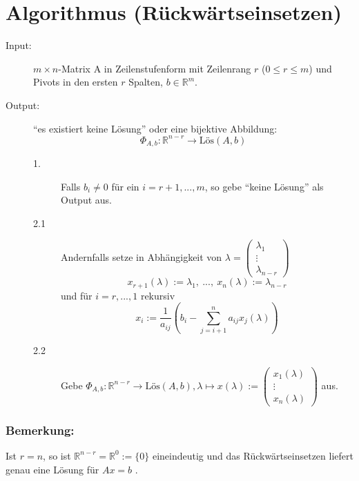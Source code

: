 \documentclass{scrbook}
\begin{document}
\section{Algorithmus (Rückwärtseinsetzen)}
\begin{description}
\item[Input:]
\(m \times n\)-Matrix A in Zeilenstufenform mit Zeilenrang $r$ (\(0 \leq r \leq m\)) und Pivots in den ersten $r$ Spalten, \(b \in \mathbb{R}^m\).
\item[Output:]
"`es existiert keine Lösung"' oder eine bijektive Abbildung:
\[
\Phi_{A,b}:\mathbb{R}^{n-r} \rightarrow \text{Lös}(A,b)
\]
\begin{description}
\item[1.] Falls \(b_i \neq 0\) für ein \(i = r+1,...,m\), so gebe "`keine Lösung"' als Output aus.
\item[2.1] Andernfalls setze in Abhängigkeit von \(\lambda =
\left( \begin{array}{c}
\lambda_1\\
\vdots\\
\lambda_{n-r}
\end{array}\right)
\)
\[
x_{r+1}(\lambda):= \lambda_1,\ ...,\ x_n(\lambda):=\lambda_{n-r}
\]
und für \(i=r,...,1\) rekursiv
\[
x_i:=\dfrac{1}{a_{ij}}(b_i-\sum_{j=i+1}^n a_{ij} x_j(\lambda))
\]
\item[2.2] Gebe \(\Phi_{A,b}:\mathbb{R}^{n-r}\rightarrow \text{Lös}(A,b),\lambda\mapsto x(\lambda):=\left(\begin{array}{c}
x_1(\lambda)\\
\vdots\\
x_n(\lambda)
\end{array}\right)
\) aus.
\end{description}
\end{description}
\subsubsection*{Bemerkung:}
Ist \(r=n\), so ist \(\mathbb{R}^{n-r}=\mathbb{R}^0:=\{0\}\) eineindeutig und das Rückwärtseinsetzen liefert genau eine Lösung für \(Ax=b\) .
\end{document}

